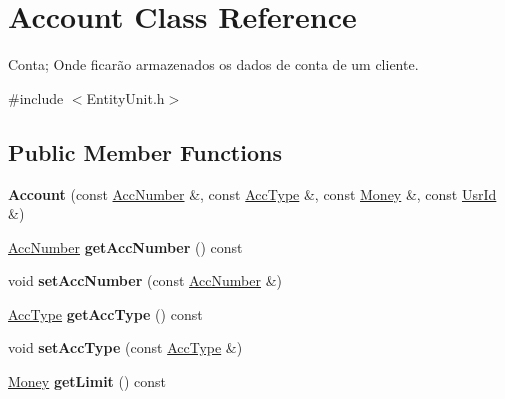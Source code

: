 \hypertarget{classAccount}{\section{Account Class Reference}
\label{classAccount}
}


Conta; Onde ficarão armazenados os dados de conta de um cliente.  




{\ttfamily \#include $<$Entity\-Unit.\-h$>$}

\subsection*{Public Member Functions}
\begin{DoxyCompactItemize}
\item 
\hypertarget{classAccount_a26dcd22e552626c14728150a671608a1}{{\bfseries Account} (const \hyperlink{classAccNumber}{Acc\-Number} \&, const \hyperlink{classUsrType}{Acc\-Type} \&, const \hyperlink{classMoney}{Money} \&, const \hyperlink{classUsrId}{Usr\-Id} \&)}\label{classAccount_a26dcd22e552626c14728150a671608a1}

\item 
\hypertarget{classAccount_a74f26f24e13e66a055bb8441dfb3d881}{\hyperlink{classAccNumber}{Acc\-Number} {\bfseries get\-Acc\-Number} () const }\label{classAccount_a74f26f24e13e66a055bb8441dfb3d881}

\item 
\hypertarget{classAccount_a3e669090168f13d2a8269af456546a1e}{void {\bfseries set\-Acc\-Number} (const \hyperlink{classAccNumber}{Acc\-Number} \&)}\label{classAccount_a3e669090168f13d2a8269af456546a1e}

\item 
\hypertarget{classAccount_a34e1f7e507d7abdf575e4833d6f8d36b}{\hyperlink{classUsrType}{Acc\-Type} {\bfseries get\-Acc\-Type} () const }\label{classAccount_a34e1f7e507d7abdf575e4833d6f8d36b}

\item 
\hypertarget{classAccount_a3a8e8aa0094b2af0496d45714f694256}{void {\bfseries set\-Acc\-Type} (const \hyperlink{classUsrType}{Acc\-Type} \&)}\label{classAccount_a3a8e8aa0094b2af0496d45714f694256}

\item 
\hypertarget{classAccount_ac67a380f5f320a44f9bb464f6efd59f7}{\hyperlink{classMoney}{Money} {\bfseries get\-Limit} () const }\label{classAccount_ac67a380f5f320a44f9bb464f6efd59f7}


\end{DoxyCompactItemize}
